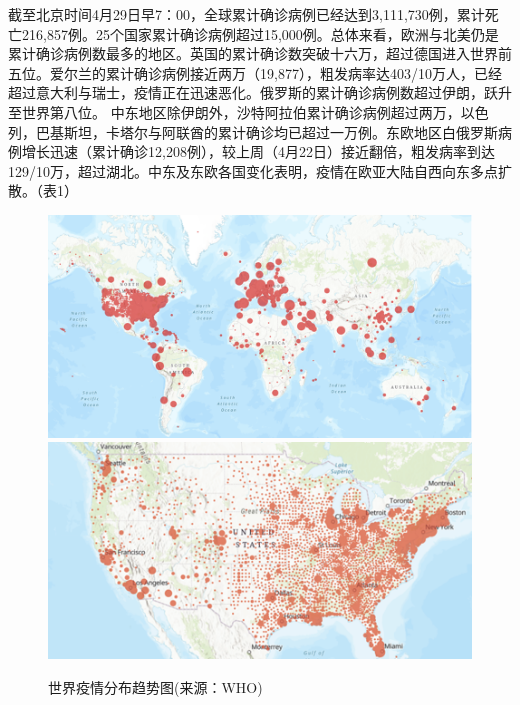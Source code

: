\documentclass[
]{article}
\begin{document}
截至北京时间4月29日早7：00，全球累计确诊病例已经达到3,111,730例，累计死亡216,857例。25个国家累计确诊病例超过15,000例。总体来看，欧洲与北美仍是累计确诊病例数最多的地区。英国的累计确诊数突破十六万，超过德国进入世界前五位。爱尔兰的累计确诊病例接近两万（19,877），粗发病率达403/10万人，已经超过意大利与瑞士，疫情正在迅速恶化。俄罗斯的累计确诊病例数超过伊朗，跃升至世界第八位。
中东地区除伊朗外，沙特阿拉伯累计确诊病例超过两万，以色列，巴基斯坦，卡塔尔与阿联酋的累计确诊均已超过一万例。东欧地区白俄罗斯病例增长迅速（累计确诊12,208例），较上周（4月22日）接近翻倍，粗发病率到达129/10万，超过湖北。中东及东欧各国变化表明，疫情在欧亚大陆自西向东多点扩散。（表1）

\begin{figure}[H]
\caption{世界疫情分布趋势图(来源：WHO)} %
\centering
\includegraphics[]{./input/covid1.png} %
\includegraphics[]{./input/covid4.png}
\label{} %
\end{figure}
\end{document}
